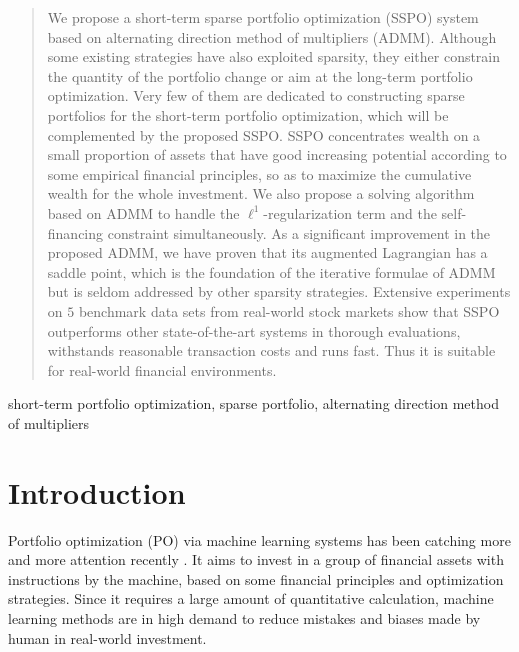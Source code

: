\documentclass[twoside,11pt]{article}
\begin{document}
\begin{abstract}%
We propose a short-term sparse portfolio optimization (SSPO) system based on alternating direction method of multipliers (ADMM). Although some existing strategies have also exploited sparsity, they either constrain the quantity of the portfolio change or aim at the long-term portfolio optimization. Very few of them are dedicated to constructing sparse portfolios for the short-term portfolio optimization, which will be complemented by the proposed SSPO. SSPO concentrates wealth on a small proportion of assets that have good increasing potential according to some empirical financial principles, so as to maximize the cumulative wealth for the whole investment. We also propose a solving algorithm based on ADMM to handle the $\ell^1$-regularization term and the self-financing constraint simultaneously. As a significant improvement in the proposed ADMM, we have proven that its augmented Lagrangian has a saddle point, which is the foundation of the iterative formulae of ADMM but is seldom addressed by other sparsity strategies. Extensive experiments on $5$ benchmark data sets from real-world stock markets show that SSPO outperforms other state-of-the-art systems in thorough evaluations, withstands reasonable transaction costs and runs fast. Thus it is suitable for real-world financial environments.
\end{abstract}

\begin{keywords}
short-term portfolio optimization, sparse portfolio, alternating direction method of multipliers
\end{keywords}



\section{Introduction}
\label{sec:intro}
Portfolio optimization (PO) via machine learning systems has been catching more and more attention recently \citep{OLMAR0,RMR,OLMAR,olpssurvey,hiorcouple,rubuststatvarPO,RMR2,olpsjmlr,cointel}. It aims to invest in a group of financial assets with instructions by the machine, based on some financial principles and optimization strategies. Since it requires a large amount of quantitative calculation, machine learning methods are in high demand to reduce mistakes and biases made by human in real-world investment.
\end{document}

